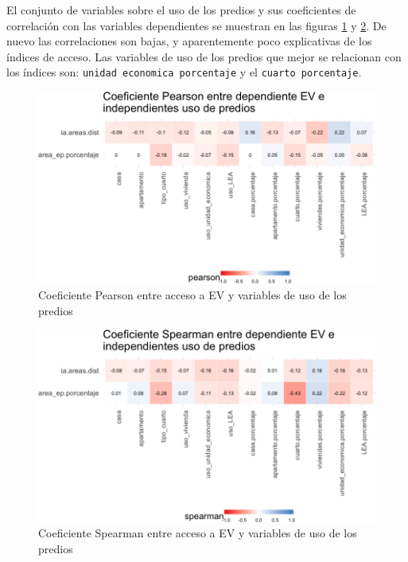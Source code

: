 \documentclass[12pt,a4paper,openany]{book}
\theoremstyle{definition}
\theoremstyle{definition}
\theoremstyle{definition}
\theoremstyle{remark}
\begin{document}
El conjunto de variables sobre el uso de los predios y sus coeficientes
de correlación con las variables dependientes se muestran en las figuras
\ref{fig:tile-ev-uso-pearson} y \ref{fig:tile-ev-uso-spearman}. De nuevo
las correlaciones son bajas, y aparentemente poco explicativas de los
índices de acceso. Las variables de uso de los predios que mejor se
relacionan con los índices son: \texttt{unidad\ economica\ porcentaje} y
el \texttt{cuarto\ porcentaje}.

\begin{figure}

{\centering \includegraphics[width=1\linewidth]{tesis-unigis_files/figure-latex/tile-ev-uso-pearson-1} 

}

\caption{Coeficiente Pearson entre acceso a EV y variables de uso de los predios}\label{fig:tile-ev-uso-pearson}
\end{figure}

\begin{figure}

{\centering \includegraphics[width=1\linewidth]{tesis-unigis_files/figure-latex/tile-ev-uso-spearman-1} 

}

\caption{Coeficiente Spearman entre acceso a EV y variables de uso de los predios}\label{fig:tile-ev-uso-spearman}
\end{figure}
\end{document}

